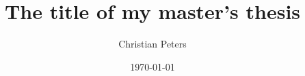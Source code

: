 \documentclass[a4paper,12pt,bibliography=totoc, listof=totoc]{scrartcl}
\title{The title of my master's thesis}
\author{Christian Peters}
\date{\today}
\begin{document}














\newpage

\nocite{*}





\end{document}

